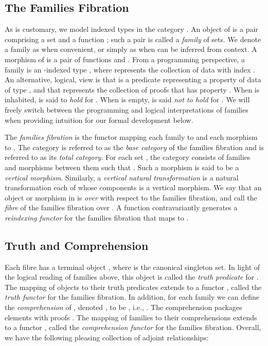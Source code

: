 \documentclass{LMCS}
\begin{document}
\subsection{The Families Fibration}

As is customary, we model indexed types in the category .
An object of  is a pair  comprising a set  and a
function ; such a pair is called a {\em family} of
sets. We denote a family  as  when convenient,
or simply as  when  can be inferred from context. A morphism
 of  is a pair of
functions  and . From a programming perspective, a family  is an
-indexed type , where  represents the collection of data
with index . An alternative, logical, view is that  is a
predicate representing a property  of data of type , and that  represents the collection of proofs that  has property . When
 is inhabited,  is said to {\em hold} for . When  is
empty,  is said {\em not to hold} for . We will freely switch
between the programming and logical interpretations of families when
providing intuition for our formal development below.

The {\em families fibration}  is the functor
mapping each family  to  and each morphism  to
. The category  is referred to as the {\em base category} of
the families fibration and  is referred to as its {\em
  total category}. For each set , the category 
consists of families  and morphisms  between them
such that . Such a morphism is said to be a {\em
  vertical morphism}. Similarly, a {\em vertical natural
  transformation} is a natural transformation each of whose components
is a vertical morphism. We say that an object or morphism in
 is {\em over}  with respect to the families
fibration, and call  the \emph{fibre} of the families
fibration over .  A function  contravariantly
generates a \emph{reindexing functor}  for the families fibration that maps  to .

\subsection{Truth and Comprehension}\label{sec:truth-compr}

Each fibre  has a terminal object , where  is the canonical singleton set.  In light of the
logical reading of families above, this object is called the {\em
  truth predicate} for . The mapping of objects to their truth
predicates extends to a functor , called
the {\em truth functor} for the families fibration.  In addition, for
each family  we can define the {\em comprehension} of ,
denoted , to be , i.e., . The comprehension  packages
elements  with proofs .  The mapping of families to
their comprehensions extends to a functor , called the {\em comprehension functor} for the families
fibration. Overall, we have the following pleasing collection of
adjoint relationships:
\end{document}

